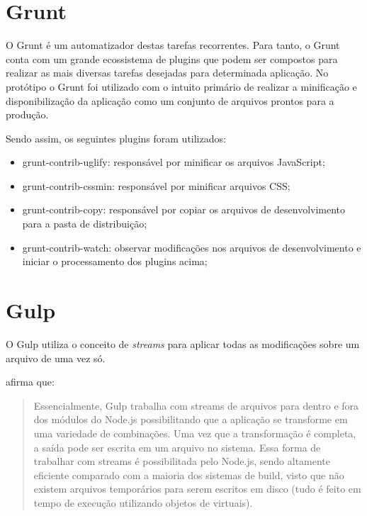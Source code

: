 \section{Grunt}

O Grunt é um automatizador destas tarefas recorrentes. Para tanto, o
Grunt conta com um grande ecossistema de plugins que podem ser compostos
para realizar as mais diversas tarefas desejadas para determinada
aplicação. No protótipo o Grunt foi utilizado com o intuito primário
de realizar a minificação e disponibilização da aplicação como um
conjunto de arquivos prontos para a produção.

Sendo assim, os seguintes plugins foram utilizados:
\begin{itemize}
    \item grunt-contrib-uglify: responsável por minificar os arquivos JavaScript;
    \item grunt-contrib-cssmin: responsável por minificar arquivos CSS;
    \item grunt-contrib-copy: responsável por copiar os arquivos de desenvolvimento para a pasta de distribuição;
    \item grunt-contrib-watch: observar modificações nos arquivos de desenvolvimento e iniciar o processamento dos plugins acima;
\end{itemize}

\section{Gulp}

O Gulp utiliza o conceito de \textit{streams} para aplicar todas as
modificações sobre um arquivo de uma vez só.

\citet{crossPlatformMobileGame} afirma que:
\begin{quote}
Essencialmente, Gulp trabalha com streams de arquivos para dentro e fora
dos módulos do Node.js possibilitando que a aplicação se transforme
em uma variedade de combinações. Uma vez que a transformação é
completa, a saída pode ser escrita em um arquivo no sistema. Essa forma
de trabalhar com streams é possibilitada pelo Node.js, sendo altamente
eficiente comparado com a maioria dos sistemas de build, visto que não
existem arquivos temporários para serem escritos em disco (tudo é
feito em tempo de execução utilizando objetos de virtuais).
\end{quote}

